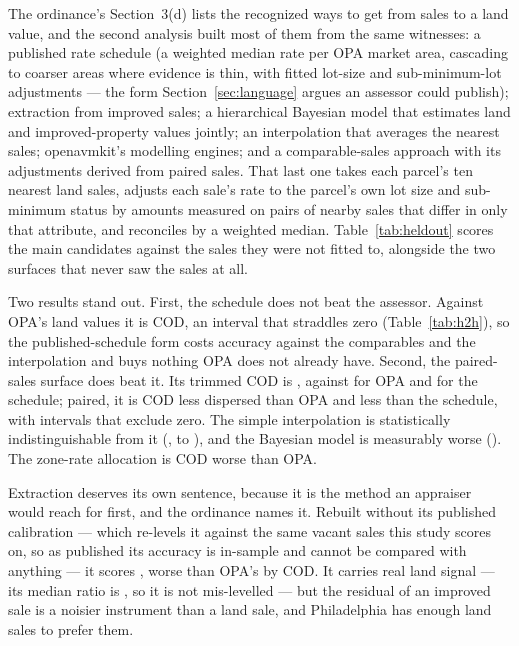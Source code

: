 \documentclass[11pt]{article}
\begin{document}
The ordinance's Section~3(d) lists the recognized ways to get from sales to a land value, and
the second analysis built most of them from the same witnesses: a published rate schedule (a
weighted median rate per OPA market area, cascading to coarser areas where evidence is thin,
with fitted lot-size and sub-minimum-lot adjustments --- the form Section~\ref{sec:language}
argues an assessor could publish); extraction from improved sales; a hierarchical Bayesian model
that estimates land and improved-property values jointly; an interpolation that averages the
nearest sales; openavmkit's modelling engines; and a comparable-sales approach with its
adjustments derived from paired sales. That last one takes each parcel's ten nearest land
sales, adjusts each sale's rate to the parcel's own lot size and sub-minimum status by amounts
measured on pairs of nearby sales that differ in only that attribute, and reconciles by a
weighted median. Table~\ref{tab:heldout} scores the main candidates against the sales they were
not fitted to, alongside the two surfaces that never saw the sales at all.

\begin{table}[t]
  \centering
  \caption{Head to head. Every surface predicts the same held-out rows, so the comparison is
  paired and the rows' shared difficulty cancels; the interval is a bootstrap over parcels. A
  negative difference means the first surface is the less dispersed.}
  \label{tab:h2h}
  
\end{table}

Two results stand out. First, the schedule does not beat the assessor. Against OPA's land
values it is \LycdSthreeVsSzeroDiff{} COD, an interval that straddles zero
(Table~\ref{tab:h2h}), so the published-schedule form costs accuracy against the comparables and the
interpolation and buys nothing OPA does not already have. Second, the paired-sales
surface does beat it. Its trimmed COD is \LycdSfiveTrCod{}, against \LycdSzeroTrCod{} for OPA and
\LycdSthreeTrCod{} for the schedule; paired, it is \LycdSfiveVsSzeroDiffAbs{} COD less dispersed
than OPA and \LycdSfiveVsSthreeDiffAbs{} less than the schedule, with intervals that exclude
zero. The simple interpolation is statistically indistinguishable from it
(\LycdSfiveVsStwoDiff{}, \LycdSfiveVsStwoLo{} to \LycdSfiveVsStwoHi{}), and the Bayesian model
is measurably worse (\LycdSeightVsSfiveDiff{}). The zone-rate allocation is
\LycdSzeroVsSoneDiffAbs{} COD worse than OPA.

Extraction deserves its own sentence, because it is the method an appraiser would reach for
first, and the ordinance names it. Rebuilt without its published calibration --- which
re-levels it against the same vacant sales this study scores on, so as published its accuracy
is in-sample and cannot be compared with anything --- it scores \LycdSfourcvTrCod{}, worse than
OPA's \LycdSzeroTrCod{} by \LycdSfourcvVsSzeroDiffAbs{} COD. It carries real land signal --- its
median ratio is \LycdSfourcvTrMedian{}, so it is not mis-levelled --- but the residual of an
improved sale is a noisier instrument than a land sale, and Philadelphia has enough land sales to
prefer them.
\end{document}

